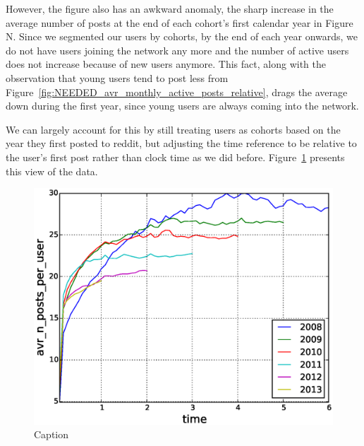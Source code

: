 However, the figure also has an awkward anomaly, the sharp increase in the average number of posts at the end of each cohort's first calendar year in Figure N.  Since we segmented our users by cohorts, by the end of each year onwards, we do not have users joining the network any more and the number of active users does not increase because of new users anymore. This fact, along with the observation that young users tend to post less from Figure~\ref{fig:NEEDED_avr_monthly_active_posts_relative}, drags the average down during the first year, since young users are always coming into the network.  


We can largely account for this by still treating users as cohorts based on the year they first posted to reddit, but adjusting the time reference to be relative to the user's first post rather than clock time as we did before.  Figure~\ref{fig:avr_posts_per_user_cohorts_relative} presents this view of the data.

\begin{figure}[!tb]
\centering
\includegraphics[scale=0.4]{./images/avr_posts_per_user_cohorts.eps}
\caption{Caption}
\label{fig:avr_posts_per_user_cohorts_relative}
\end{figure}

